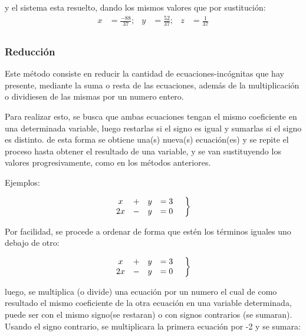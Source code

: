     y el sistema esta resuelto, dando los mismos valores que por sustitución:
    \begin{align*}
        x &=\frac{-88}{37} ;& y&=\frac{52}{37} ;& z&=\frac{1}{37}  		\\
    \end{align*}


    \subsubsection*{Reducción} \label{Reduccion}

    Este método consiste en reducir la cantidad de ecuaciones-incógnitas que hay
    presente, mediante la suma o resta de las ecuaciones, además de la multiplicación
    o dividiesen de las mismas por un numero entero.

    Para realizar esto, se busca que ambas ecuaciones tengan el mismo coeficiente
    en una determinada variable, luego restarlas si el signo es igual y sumarlas
    si el signo es distinto. de esta forma se obtiene una(s) nueva(s) ecuación(es)
    y se repite el proceso hasta obtener el resultado de una variable, y se
    van sustituyendo los valores progresivamente, como en los métodos anteriores.

    Ejemplos:

    \begin{equation*}
        \left.
        \begin{matrix}
            x &+& y &=3\\
            2x &-& y &=0
        \end{matrix}
        \hspace*{0.5cm}\right\rbrace
    \end{equation*}

    Por facilidad, se procede a ordenar de forma que estén los términos iguales
    uno debajo de otro:

    \begin{equation*}
        \left.
        \begin{matrix}
            x &+& y &=3\\
            2x &-& y &=0
        \end{matrix}
        \hspace*{0.5cm}\right\rbrace
    \end{equation*}

    luego, se multiplica (o divide) una ecuación por un numero el cual de como resultado el
    mismo coeficiente de la otra ecuación en una variable determinada, puede ser
    con el mismo signo(se restaran) o con signos contrarios (se sumaran). Usando
    el signo contrario, se multiplicara la primera ecuación por -2 y se sumara:

